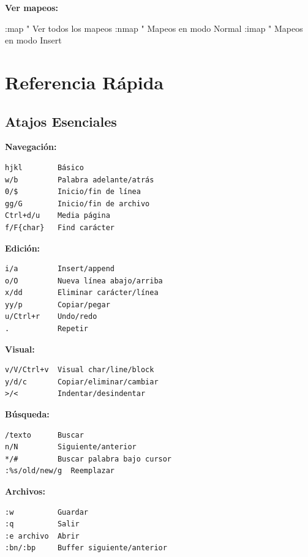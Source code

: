 \documentclass[
  doc,
  floatsintext,
  longtable,
  a4paper,
  nolmodern,
  notxfonts,
  notimes,
  12pt,
  colorlinks=true,linkcolor=blue,citecolor=blue,urlcolor=blue]{apa7}
\newenvironment{Shaded}{\begin{snugshade}}{\end{snugshade}}
\newcommand{\NormalTok}[1]{\textcolor[rgb]{0.00,0.23,0.31}{#1}}
\begin{document}
\textbf{Ver mapeos:}

\begin{Shaded}
\begin{Highlighting}[]
\NormalTok{:map                " Ver todos los mapeos}
\NormalTok{:nmap               " Mapeos en modo Normal}
\NormalTok{:imap               " Mapeos en modo Insert}
\end{Highlighting}
\end{Shaded}

\section{Referencia Rápida}\label{referencia-ruxe1pida}

\subsection{Atajos Esenciales}\label{atajos-esenciales}

\textbf{Navegación:}

\begin{verbatim}
hjkl        Básico
w/b         Palabra adelante/atrás
0/$         Inicio/fin de línea
gg/G        Inicio/fin de archivo
Ctrl+d/u    Media página
f/F{char}   Find carácter
\end{verbatim}

\textbf{Edición:}

\begin{verbatim}
i/a         Insert/append
o/O         Nueva línea abajo/arriba
x/dd        Eliminar carácter/línea
yy/p        Copiar/pegar
u/Ctrl+r    Undo/redo
.           Repetir
\end{verbatim}

\textbf{Visual:}

\begin{verbatim}
v/V/Ctrl+v  Visual char/line/block
y/d/c       Copiar/eliminar/cambiar
>/<         Indentar/desindentar
\end{verbatim}

\textbf{Búsqueda:}

\begin{verbatim}
/texto      Buscar
n/N         Siguiente/anterior
*/#         Buscar palabra bajo cursor
:%s/old/new/g  Reemplazar
\end{verbatim}

\textbf{Archivos:}

\begin{verbatim}
:w          Guardar
:q          Salir
:e archivo  Abrir
:bn/:bp     Buffer siguiente/anterior
\end{verbatim}
\end{document}
